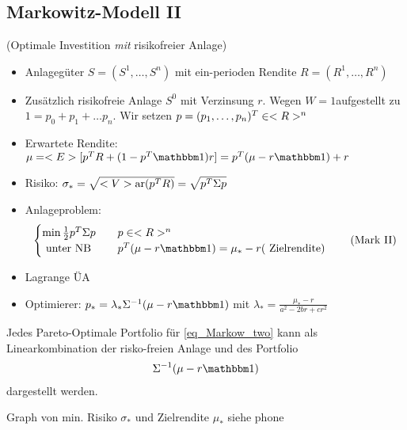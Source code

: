 \subsection*{Markowitz-Modell II}
(Optimale Investition \emph{mit} risikofreier Anlage)\\
\begin{itemize}
	\item Anlagegüter $S = (S^1, \dots, S^n)$ mit ein-perioden Rendite $R = (R^1, \dots, R^n)$
	\item Zusätzlich risikofreie Anlage $S^0$ mit Verzinsung $r$. Wegen $W=1$aufgestellt zu $1 = p_0 + p_1 + \dots p_n$. Wir setzen $p = (p_1,\dots, p_n)^T \in <R>^n$
	\item Erwartete Rendite: $\mu = \E[p^T R + (1-p^T \indi)r] = p^T(\mu - r\indi) + r$
	\item Risiko: $\sigma_{\ast} = \sqrt{<V>\text{ar}(p^T R)} = \sqrt{p^T \Sigma p}$
	\item Anlageproblem:
	\begin{align*}
		\begin{cases}
			\min \half p^T \Sigma p & \quad p \in \R^n\\
			\text{ unter NB} &\quad p^T (\mu-r\indi) = \mu_{\ast} -r (\text{ Zielrendite})\\
		\end{cases}\tag{Mark II}\label{eq_Markow_two}
	\end{align*}
	\item Lagrange ÜA
	\item Optimierer: $p_{\ast} = \lambda_{\ast}\Sigma^{-1}(\mu - r \indi)$ mit $\lambda_{\ast} = \frac{\mu_{\ast} - r}{a^2 - 2br + cr^2}$
\end{itemize}
\begin{conclusion}
	Jedes Pareto-Optimale Portfolio für \eqref{eq_Markow_two} kann als Linearkombination der risko-freien Anlage und des Portfolio
	\begin{align*}
		\Sigma^{-1}(\mu -r\indi)
	\end{align*}
	dargestellt werden.
\end{conclusion}
Graph von min. Risiko $\sigma_{\ast}$ und Zielrendite $\mu_{\ast}$
siehe phone
